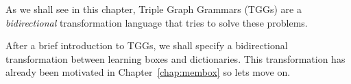As we shall see in this chapter, Triple Graph Grammars (TGGs) are a \emph{bidirectional} transformation language that tries to solve these problems.

After a brief introduction to TGGs, we shall specify a bidirectional transformation between learning boxes and dictionaries.
This transformation has already been motivated in Chapter~\ref{chap:membox} so lets move on. 